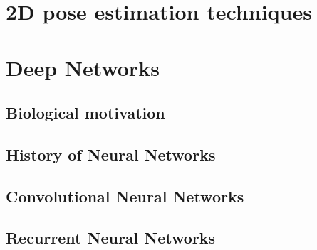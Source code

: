 \section{2D pose estimation techniques}

\section{Deep Networks}

\subsection{Biological motivation}
\subsection{History of Neural Networks}
\subsection{Convolutional Neural Networks}
\subsection{Recurrent Neural Networks}